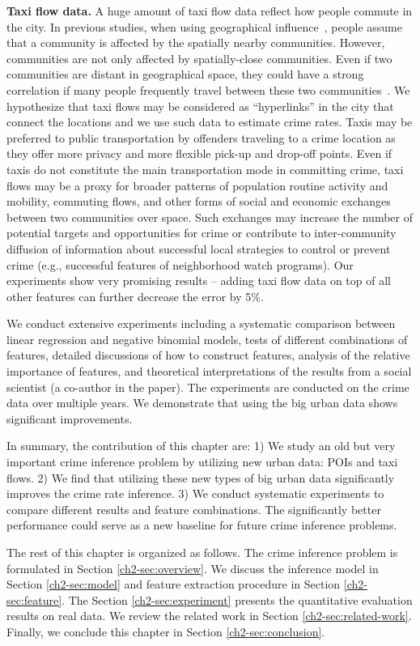 \textbf{Taxi flow data.} A huge amount of taxi flow data reflect how people commute in the city. In previous studies, when using geographical influence~\cite{Ans02}, people assume that a community is affected by the spatially nearby communities. However, communities are not only affected by spatially-close communities. Even if two communities are distant in geographical space, they could have a strong correlation if many people frequently travel between these two communities~\cite{GGM14}. We hypothesize that taxi flows may be considered as ``hyperlinks'' in the city that connect the locations and we use such data to estimate crime rates. 
Taxis may be preferred to public transportation by offenders traveling to a crime location as they offer more privacy and more flexible pick-up and drop-off points. Even if taxis do not constitute the main transportation mode in committing crime, taxi flows may be a proxy for broader patterns of population routine activity and mobility, commuting flows, and other forms of social and economic exchanges between two communities over space. Such exchanges may  increase the number of potential targets and opportunities for crime \cite{CLFM79,BPBP95} or contribute to inter-community diffusion of information about successful local strategies to control  or prevent crime (e.g., successful features of neighborhood watch programs). Our experiments show very promising results --  adding taxi flow data on top of all other features can further decrease the error by 5\%.

We conduct extensive experiments including a systematic comparison between linear regression and negative binomial models, tests of different combinations of  features, detailed discussions of how to construct features, analysis of the relative importance of features, and theoretical interpretations of the results from a social scientist (a co-author in the paper). The experiments are conducted on the crime data over multiple years. We demonstrate that using the big urban data shows significant improvements.

In summary, the contribution of this chapter are:  1) We study an old but very important crime inference problem by utilizing new urban data: POIs and taxi flows. 2) We find that utilizing these new types of big urban data significantly improves the crime rate inference. 3) We conduct systematic experiments to compare different results and feature combinations. The significantly better performance could serve as a new baseline for future crime inference problems.

The rest of this chapter is organized as follows. The crime inference problem is formulated in Section \ref{ch2-sec:overview}. We discuss the inference model in Section \ref{ch2-sec:model} and feature extraction procedure in Section \ref{ch2-sec:feature}. The Section \ref{ch2-sec:experiment} presents the quantitative evaluation results on real data. We review the related work in Section \ref{ch2-sec:related-work}.  Finally, we conclude this chapter in Section \ref{ch2-sec:conclusion}.


